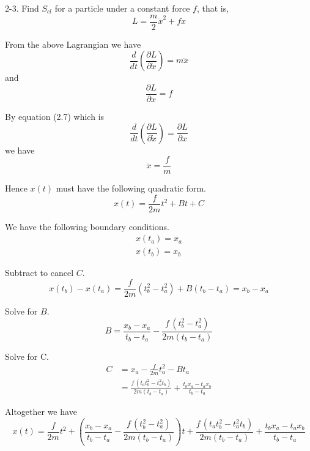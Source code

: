 \documentclass[12pt]{article}
\begin{document}
2-3.
Find $S_{cl}$ for a particle under a constant force $f$, that is,
\begin{equation*}
L=\frac{m}{2}\dot x^2+fx
\end{equation*}

From the above Lagrangian we have
\begin{equation*}
\frac{d}{dt}\left(\frac{\partial L}{\partial\dot x}\right)=m\ddot x
\end{equation*}
and
\begin{equation*}
\frac{\partial L}{\partial x}=f
\end{equation*}

By equation (2.7) which is
\begin{equation*}
\frac{d}{dt}\left(\frac{\partial L}{\partial\dot x}\right)=\frac{\partial L}{\partial x}
\end{equation*}
we have
\begin{equation*}
\ddot x=\frac{f}{m}
\end{equation*}

Hence $x(t)$ must have the following quadratic form.
\begin{equation*}
x(t)=\frac{f}{2m}t^2+Bt+C
\end{equation*}

We have the following boundary conditions.
\begin{align*}
x(t_a)=x_a\\
x(t_b)=x_b
\end{align*}

Subtract to cancel $C$.
\begin{equation*}
x(t_b)-x(t_a)=\frac{f}{2m}\left(t_b^2-t_a^2\right)+B(t_b-t_a)=x_b-x_a
\end{equation*}

Solve for $B$.
\begin{equation*}
B=\frac{x_b-x_a}{t_b-t_a}-\frac{f\,\left(t_b^2-t_a^2\right)}{2m(t_b-t_a)}
\end{equation*}

Solve for C.
\begin{align*}
C&=x_a-\frac{f}{2m}t_a^2-Bt_a
\\[1ex]
&=\frac{f\,\left(t_a t_b^2 - t_a^2 t_b\right)}{2 m (t_b - t_a)} + \frac{t_b x_a - t_a x_b}{t_b - t_a}
\end{align*}

Altogether we have
\begin{equation*}
x(t)=
\frac{f}{2m}t^2
+\left(\frac{x_b-x_a}{t_b-t_a}-\frac{f\,\left(t_b^2-t_a^2\right)}{2m(t_b-t_a)}\right)t
+\frac{f\,\left(t_a t_b^2 - t_a^2 t_b\right)}{2 m (t_b - t_a)} + \frac{t_b x_a - t_a x_b}{t_b - t_a}
\tag{1}
\end{equation*}
\end{document}
